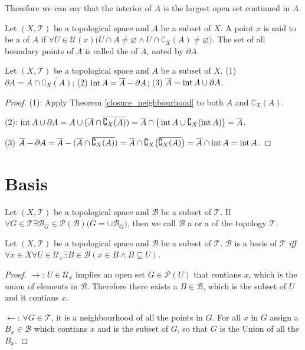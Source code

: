 \documentclass[openany]{book}
\begin{document}
Therefore we can say that the interior of $A$ is the largest open set contianed in $A$.

\begin{definition}
Let $(X,\mathscr T)$ be a topological space and $A$ be a subset of $X$. 
A point $x$ is said to be a  of $A$ if 
$\forall U\in \mathscr U(x)\big(
	U\cap A\neq \varnothing \wedge U\cap \complement_X(A)\neq \varnothing\big)$.
The set of all boundary points of $A$ is called the  of $A$, noted by $\partial A$.
\end{definition}

\begin{theorem}\label{boundary_propoties}
Let $(X,\mathscr T)$ be a topological space and $A$ be a subset of $X$. 
(1) $\partial A = \overline A \cap \overline{\complement_X(A)}$;
(2) $\operatorname{int} A = \overline A - \partial A$;
(3) $\overline A = \operatorname{int} A\cup \partial A$.
\end{theorem}
\begin{proof}
(1): Apply Theorem \ref{closure_neighbourhood} to both $A$ and $\complement_X(A)$.

(2): $\operatorname{int} A \cup \partial A=
	A\cup(\overline A\cap \overline{\complement_X (A)})=
		\overline A\cap \big(\operatorname{int} A\cup \complement_X (\operatorname{int} A)\big) = \overline A$.
		
(3) $\overline A -\partial A= 
	\overline A - (\overline A\cap \overline{\complement_X (A)}) = 
		\overline A \cap \complement_X\big(
			\overline{
				\complement_X(A)}\big) = 
			\overline A\cap \operatorname{int} A = 
				\operatorname{int} A$.
\end{proof}

\section{Basis}
\begin{definition}
Let $(X,\mathscr T)$ be a topological space and $\mathscr B$ be a subset of $\mathscr T$.
If $\forall G\in \mathscr T 
	\exists \mathscr B_G\in \mathscr P(\mathscr B) \big(
		G=\cup \mathscr B_G\big)$, 
then we call $\mathscr B$ a  or a  of the topology $\mathscr T$.
\end{definition}

\begin{theorem}\label{basis_iff_neighbourhood}
Let $(X,\mathscr T)$ be a topological space and $\mathscr B$ be a subset of $\mathscr T$.
$\mathscr B$ is a basis of $\mathscr T$ \emph{iff} 
$\forall x\in X
	\forall U\in \mathscr U_x
		\exists B\in \mathscr B(
			x\in B\wedge B\subseteq U)$.
\end{theorem}
\begin{proof}
$\to$:
$U\in \mathscr U_x$ implies an open set $G\in \mathscr P(U)$ that contians $x$, which is the union of elements in $\mathscr B$.
Therefore there exists a $B\in \mathscr B$, which is the subset of $U$ and it contians $x$.

$\leftarrow$: 
$\forall G\in \mathscr T$, it is a neighbourhood of all the points in $G$.
For all $x$ in $G$ assign a $B_x\in \mathscr B$ which contians $x$ and is the subset of $G$, so that $G$ is the Union of all the $B_x$.
\end{proof}
\end{document}
